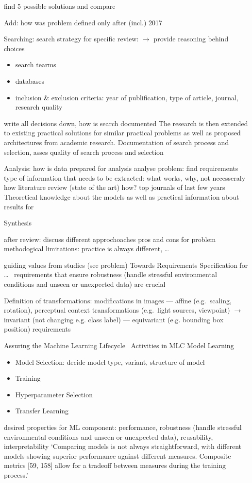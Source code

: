 

find 5 possible solutions and compare

Add: how was problem defined
only after (incl.) 2017

Searching:
search strategy for specific review: $\rightarrow$ provide reasoning behind choices
\begin{itemize}
    \item search tearms
    \item databases
    \item inclusion \& exclusion criteria: year of publification, type of article, journal, research
        quality
\end{itemize}
write all decisions down, how is search documented
The research is then extended to existing practical solutions for similar practical problems as
well as proposed architectures from academic research.
Documentation of search process and selection, asses quality of search process and selection

Analysis:
how is data prepared for analysis
analyse problem: find requirements
type of information that needs to be extracted: what works, why, not necesseraly how
literature review (state of the art)
how? top journals of last few years
Theoretical knowledge about the models as well as practical information about results for

Synthesis

after review:
discuss different approchoaches pros and cons for problem
methodogical limitations: practice is always different, \ldots


guiding values from studies (see problem)
Towards Requirements Specification for \ldots~\cite{hu_towards_2020}
requirements that ensure robustness (handle stressful environmental conditions and unseen or
unexpected data) are crucial

Definition of transformations: modifications in images
--- affine (e.g.\ scaling, rotation), perceptual context transformations (e.g.\ light sources, viewpoint)
$\rightarrow$ invariant (not changing e.g. class label) --- equivariant (e.g. bounding
                box position) requirements


Assuring the Machine Learning Lifecycle~\cite{ashmore_assuring_2021}
Activities in MLC Model Learning
\begin{itemize}
    \item Model Selection: decide model type, variant, structure of model
    \item Training
    \item Hyperparameter Selection
    \item Transfer Learning
\end{itemize}
desired properties for ML component: performance, robustness (handle stressful environmental
conditions and unseen or unexpected data), reusability, interpretability
`Comparing models is not always straightforward, with different models showing superior performance
against different measures. Composite metrics [59, 158] allow for a tradeoff between measures
during the training process.'

